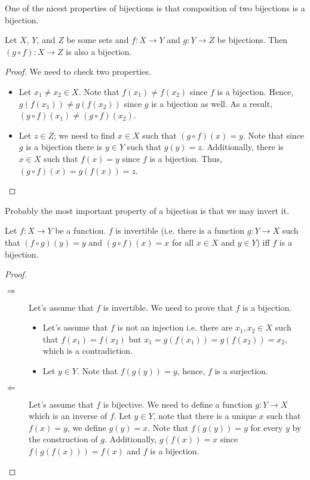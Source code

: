 One of the nicest properties of bijections is that composition of two bijections
is a bijection.
\begin{theorem}
\label{theorem:bijections-composition}
  Let $X$, $Y$, and $Z$ be some sets and $f : X \to Y$ and $g : Y \to Z$ be
  bijections. Then $(g \circ f) : X \to Z$ is also a bijection.
\end{theorem}
\begin{proof}
  We need to check two properties.
  \begin{itemize}
    \item Let $x_1 \neq x_2 \in X$. Note that $f(x_1) \neq f(x_2)$ since $f$
      is a bijection. Hence, $g(f(x_1)) \neq g(f(x_2))$ since $g$ is a bijection
      as well. As a result, $(g \circ f)(x_1) \neq (g \circ f)(x_2)$.
    \item Let $z \in Z$; we need to find $x \in X$ such that
      $(g \circ f)(x) = y$. Note that since $g$ is a bijection there is
      $y \in Y$ such that $g(y) = z$. Additionally, there is $x \in X$ such
      that $f(x) = y$ since $f$ is a bijection. Thus,
      $(g \circ f)(x) = g(f(x)) = z$.
  \end{itemize}
\end{proof}

Probably the most important property of a bijection is that we may invert it.
\begin{theorem}
\label{theorem:inverse-of-bijections}
  Let $f : X \to Y$ be a function. $f$ is invertible (i.e. there is a function
  $g : Y \to X$ such that $(f \circ g)(y) = y$ and $(g \circ f)(x) = x$ for all
  $x \in X$ and $y \in Y$) iff $f$ is a bijection.
\end{theorem}
\begin{proof}
  \begin{description}
    \item[$\Rightarrow$] Let's assume that $f$ is invertible. We need to prove
      that $f$ is a bijection.
      \begin{itemize}
        \item Let's assume that $f$ is not an injection i.e. there are
          $x_1, x_2 \in X$ such that $f(x_1) = f(x_2)$ but $x_1 = g(f(x_1)) =
          g(f(x_2)) = x_2$, which is a contradiction.
        \item Let $y \in Y$. Note that $f(g(y)) = y$, hence, $f$ is a
          surjection.
      \end{itemize}

    \item[$\Leftarrow$] Let's assume that $f$ is bijective. We need to define a
      function $g : Y \to X$ which is an inverse of $f$. Let $y \in Y$, note
      that there is a unique $x$ such that $f(x) = y$, we define $g(y) = x$.
      Note that $f(g(y)) = y$ for every $y$ by the construction of $g$.
      Additionally, $g(f(x)) = x$ since $f(g(f(x))) = f(x)$ and $f$ is a
      bijection.
  \end{description}
\end{proof}

